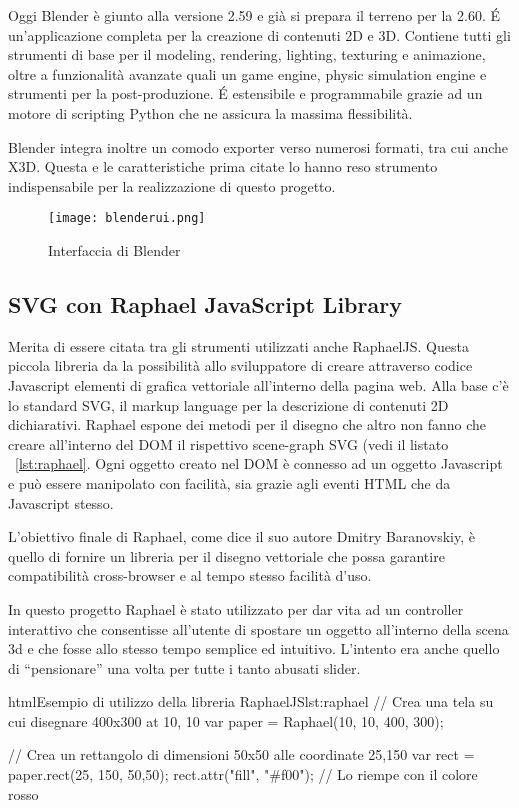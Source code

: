 Oggi Blender è giunto alla versione 2.59 e già si prepara il terreno per la 2.60. \'{E} un'applicazione completa per la creazione di contenuti 2D e 3D. Contiene tutti gli strumenti di base per il modeling, rendering, lighting, texturing e animazione, oltre a funzionalità avanzate quali un game engine, physic simulation engine e strumenti per la post-produzione. \'{E} estensibile e programmabile grazie ad un motore di scripting Python che ne assicura la massima flessibilità.

Blender integra inoltre un comodo exporter verso numerosi formati, tra cui anche X3D. Questa e le caratteristiche prima citate lo hanno reso strumento indispensabile per la realizzazione di questo progetto.

\begin{figure}[Ht]
\centering
\texttt{[image: blenderui.png]}
\caption{Interfaccia di Blender}
\label{label:blenderui}
\end{figure}

\subsection{SVG con Raphael JavaScript Library}
Merita di essere citata tra gli strumenti utilizzati anche RaphaelJS. Questa piccola libreria da la possibilità allo sviluppatore di creare attraverso codice Javascript elementi di grafica vettoriale all'interno della pagina web. Alla base c'è lo standard SVG, il markup language per la descrizione di contenuti 2D dichiarativi. Raphael espone dei metodi per il disegno che altro non fanno che creare all'interno del DOM il rispettivo scene-graph SVG (vedi il listato ~\ref{lst:raphael}. Ogni oggetto creato nel DOM è connesso ad un oggetto Javascript e può essere manipolato con facilità, sia grazie agli eventi HTML che da Javascript stesso.

L'obiettivo finale di Raphael, come dice il suo autore Dmitry Baranovskiy, è quello di fornire un libreria per il disegno vettoriale che possa garantire compatibilità cross-browser e al tempo stesso facilità d'uso.

In questo progetto Raphael è stato utilizzato per dar vita ad un controller interattivo che consentisse all'utente di spostare un oggetto all'interno della scena 3d e che fosse allo stesso tempo semplice ed intuitivo. L'intento era anche quello di ``pensionare'' una volta per tutte i tanto abusati slider.

\begin{mylisting}{html}{Esempio di utilizzo della libreria RaphaelJS}{lst:raphael}
// Crea una tela su cui disegnare 400x300 at 10, 10
var paper = Raphael(10, 10, 400, 300);

// Crea un rettangolo di dimensioni 50x50 alle coordinate 25,150
var rect = paper.rect(25, 150, 50,50);
rect.attr("fill", "#f00"); // Lo riempe con il colore rosso
\end{mylisting}

